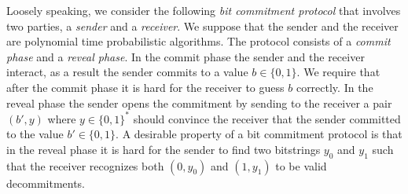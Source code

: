 Loosely speaking, we consider the following \textit{bit commitment protocol} that involves two parties, a \textit{sender} and a \textit{receiver}.
We suppose that the sender and the receiver are polynomial time probabilistic algorithms.
The protocol consists of a \textit{commit phase} and a \textit{reveal phase}.
In the commit phase the sender and the receiver interact, as a result the sender commits to a value $b \in \{0,1\}$.
We require that after the commit phase it is hard for the receiver to guess $b$ correctly.
In the reveal phase the sender opens the commitment by sending to the receiver a pair $(b', y)$ where $y \in \{0,1\}^{*}$
should convince the receiver that the sender committed to the value $b' \in \{0,1\}$.
A desirable property of a bit commitment protocol is that in the reveal phase it is hard for
the sender to find two bitstrings $y_0$ and $y_1$ such that the receiver recognizes both $(0,y_0)$ and $(1, y_1)$ to be valid decommitments.

